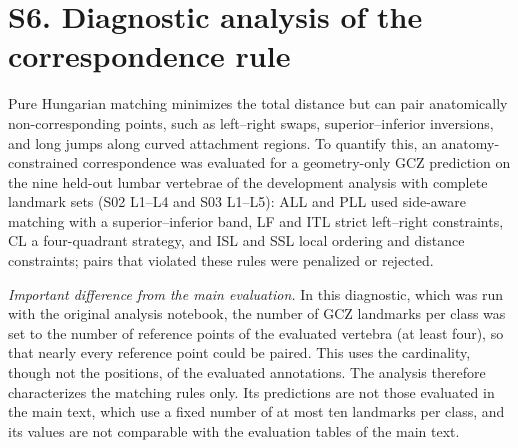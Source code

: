 \documentclass[10pt,a4paper]{article}
\begin{document}
\begin{table}[h]
\centering
\small
\caption{Mean over classes of the leave-one-vertebra-out calibration MAE (mm) under the published and corrected protocols, and the MAE of the bilateral classes under the corrected protocol (published values in parentheses).}
\label{tab:regcorr}
\end{table}

\section*{S6. Diagnostic analysis of the correspondence rule}

Pure Hungarian matching minimizes the total distance but can pair anatomically non-corresponding points, such as left--right swaps, superior--inferior inversions, and long jumps along curved attachment regions. To quantify this, an anatomy-constrained correspondence was evaluated for a geometry-only GCZ prediction on the nine held-out lumbar vertebrae of the development analysis with complete landmark sets (S02 L1--L4 and S03 L1--L5): ALL and PLL used side-aware matching with a superior--inferior band, LF and ITL strict left--right constraints, CL a four-quadrant strategy, and ISL and SSL local ordering and distance constraints; pairs that violated these rules were penalized or rejected.

\textit{Important difference from the main evaluation.} In this diagnostic, which was run with the original analysis notebook, the number of GCZ landmarks per class was set to the number of reference points of the evaluated vertebra (at least four), so that nearly every reference point could be paired. This uses the cardinality, though not the positions, of the evaluated annotations. The analysis therefore characterizes the matching rules only. Its predictions are not those evaluated in the main text, which use a fixed number of at most ten landmarks per class, and its values are not comparable with the evaluation tables of the main text.
\end{document}
